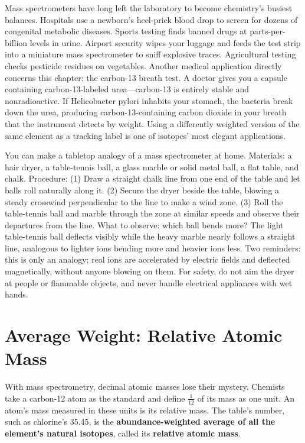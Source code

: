 Mass spectrometers have long left the laboratory to become chemistry's busiest balances. Hospitals use a newborn's heel-prick blood drop to screen for dozens of congenital metabolic diseases. Sports testing finds banned drugs at parts-per-billion levels in urine. Airport security wipes your luggage and feeds the test strip into a miniature mass spectrometer to sniff explosive traces. Agricultural testing checks pesticide residues on vegetables. Another medical application directly concerns this chapter: the carbon-13 breath test. A doctor gives you a capsule containing carbon-13-labeled urea---carbon-13 is entirely stable and nonradioactive. If Helicobacter pylori inhabits your stomach, the bacteria break down the urea, producing carbon-13-containing carbon dioxide in your breath that the instrument detects by weight. Using a differently weighted version of the same element as a tracking label is one of isotopes' most elegant applications.

\begin{shiyan}
You can make a tabletop analogy of a mass spectrometer at home. Materials: a hair dryer, a table-tennis ball, a glass marble or solid metal ball, a flat table, and chalk. Procedure: (1) Draw a straight chalk line from one end of the table and let balls roll naturally along it. (2) Secure the dryer beside the table, blowing a steady crosswind perpendicular to the line to make a wind zone. (3) Roll the table-tennis ball and marble through the zone at similar speeds and observe their departures from the line. What to observe: which ball bends more? The light table-tennis ball deflects visibly while the heavy marble nearly follows a straight line, analogous to lighter ions bending more and heavier ions less. Two reminders: this is only an analogy; real ions are accelerated by electric fields and deflected magnetically, without anyone blowing on them. For safety, do not aim the dryer at people or flammable objects, and never handle electrical appliances with wet hands.
\end{shiyan}

\section{Average Weight: Relative Atomic Mass}

With mass spectrometry, decimal atomic masses lose their mystery. Chemists take a carbon-12 atom as the standard and define $\frac{1}{12}$ of its mass as one unit. An atom's mass measured in these units is its relative mass. The table's number, such as chlorine's 35.45, is the \textbf{abundance-weighted average of all the element's natural isotopes}, called its \textbf{relative atomic mass}.

